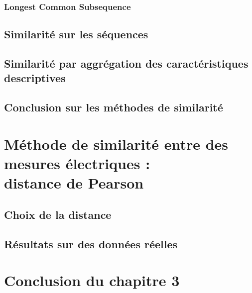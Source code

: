 	\subsubsection{Longest Common Subsequence}
		
%		
%		
	
\subsection{Similarit\'e sur les s\'equences}
	
\subsection{Similarit\'e par aggr\'egation des caract\'eristiques descriptives}
	
\subsection{Conclusion sur les m\'ethodes de similarit\'e}
	

\section{M\'ethode de similarit\'e entre des mesures \'electriques : \\ distance de Pearson}
	\subsection{Choix de la distance}
		
%		
	\subsection{R\'esultats sur des donn\'ees r\'eelles}
		
\section{Conclusion du chapitre 3}
			

